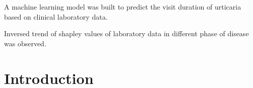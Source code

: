 \documentclass[final,3p,times,authoryear]{elsarticle}
\begin{document}
\begin{frontmatter}

\begin{highlights}
\item A machine learning model was built to predict the visit duration of urticaria based on clinical laboratory data.
\item Inversed trend of shapley values of laboratory data in different phase of disease was observed.
\end{highlights}

\begin{keyword}



\end{keyword}

\end{frontmatter}


\sloppy %

\section{Introduction}\label{Introduction}
\end{document}
